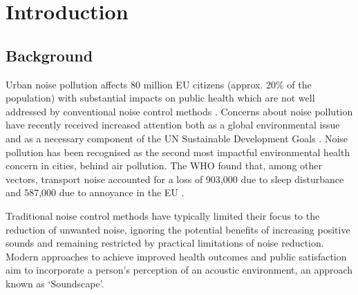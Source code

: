 \chapter{Introduction}
\label{ch:intro}



\section{Background}

Urban noise pollution affects 80 million EU citizens (approx. 20\% of the population) with substantial impacts on public health which are not well addressed by conventional noise control methods \citep{EEA2020Environmental}. Concerns about noise pollution have recently received increased attention both as a global environmental issue \citep{Aletta2022Frontiers} and as a necessary component of the UN Sustainable Development Goals \citep{King2022Here}. Noise pollution has been recognised as the second most impactful environmental health concern in cities, behind air pollution. The WHO found that, among other vectors, transport noise accounted for a loss of 903,000  due to sleep disturbance and 587,000  due to annoyance in the EU \citep{CDC2011Burden}.

Traditional noise control methods have typically limited their focus to the reduction of unwanted noise, ignoring the potential benefits of increasing positive sounds and remaining restricted by practical limitations of noise reduction. Modern approaches to achieve improved health outcomes and public satisfaction aim to incorporate a person's perception of an acoustic environment, an approach known as `Soundscape'\footnotemark.

